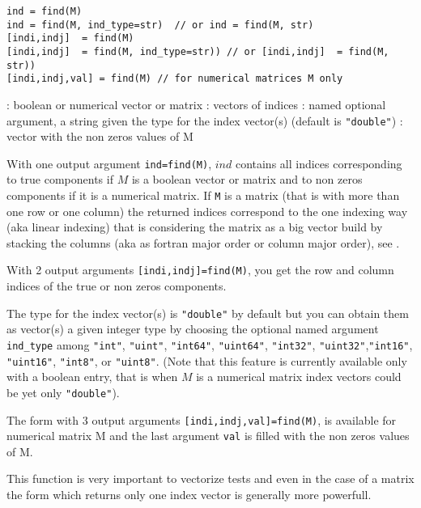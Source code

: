
\begin{mandesc}
\end{mandesc}

\begin{calling_sequence}
\begin{verbatim}
ind = find(M)
ind = find(M, ind_type=str)  // or ind = find(M, str)
[indi,indj]  = find(M)
[indi,indj]  = find(M, ind_type=str)) // or [indi,indj]  = find(M, str))
[indi,indj,val] = find(M) // for numerical matrices M only
\end{verbatim}
\end{calling_sequence}
\begin{parameters}
  \begin{varlist}
    :  boolean or  numerical vector or matrix
    : vectors of indices
    : named optional argument, a string given the type for the index vector(s) (default is \verb+"double"+)
    : vector with the non zeros values of M
  \end{varlist}
\end{parameters}

\begin{mandescription}
With one output argument \verb+ind=find(M)+,  $ind$ contains all indices 
corresponding to true components if $M$ is a boolean vector or matrix 
and to non zeros components if it is a numerical matrix. If \verb+M+
is a matrix (that is with more than one row or one
column) the returned indices correspond to the one indexing way (aka
linear indexing)
that is considering the matrix as a big vector build by stacking 
the columns (aka as fortran major order or column major order),
see .

With 2 output arguments \verb+[indi,indj]=find(M)+,
you get the  row and column indices of the true or non zeros components.

The type for the index vector(s) is \verb+"double"+ by default but you
can obtain them as vector(s) a given integer type by choosing the optional named argument
\verb+ind_type+ among \verb+"int"+,  \verb+"uint"+, \verb+"int64"+, \verb+"uint64"+,
\verb+"int32"+, \verb+"uint32"+,\verb+"int16"+, \verb+"uint16"+, \verb+"int8"+, or \verb+"uint8"+.
(Note that this feature is currently available only with a boolean entry, that is
when  $M$ is a numerical matrix index vectors could be yet only \verb+"double"+).

The form with 3 output arguments \verb+[indi,indj,val]=find(M)+, is available
for numerical matrix M and the last argument \verb+val+ is filled with
the non zeros values of M.


This function is very important to vectorize tests and even in the 
case of a matrix the form which returns only one 
index vector is generally more powerfull.
\end{mandescription}

